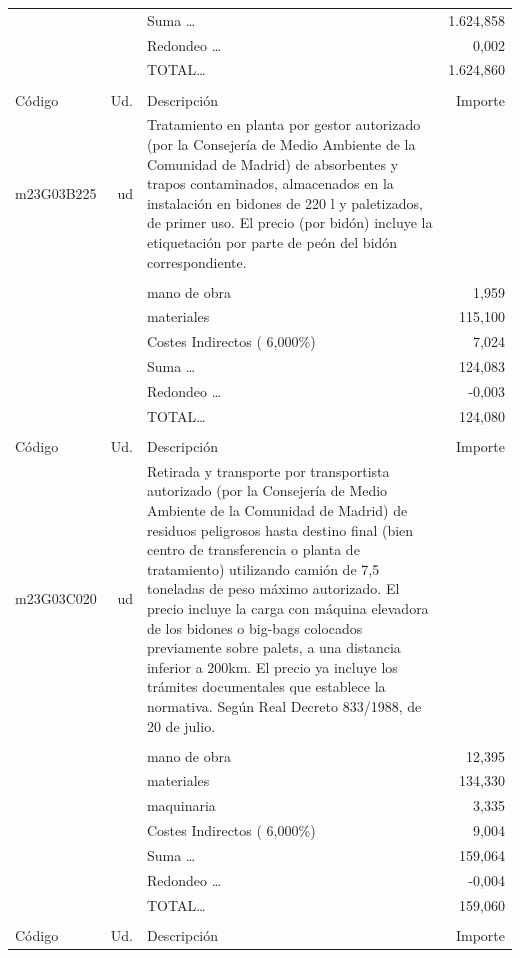 \begin{supertabular}{l r p{60mm} r}
&&Suma \ldots& 1.624,858\\%
&&Redondeo \ldots&     0,002\\%
%
&&TOTAL\ldots& 1.624,860\\%
&&&\\%
Código&Ud.&Descripción&Importe\\%
\hline%
m23G03B225&ud&Tratamiento en planta por gestor autorizado (por la Consejería de Medio Ambiente de la Comunidad de Madrid) de absorbentes y trapos contaminados, almacenados en la instalación en bidones de 220 l y paletizados, de primer uso. El precio (por bidón) incluye la etiquetación por parte de peón del bidón correspondiente.&\\%
&&&\\%
&&mano de obra&     1,959\\%
&&materiales&   115,100\\%
&&Costes Indirectos (     6,000\%)&     7,024\\%
&&Suma \ldots&   124,083\\%
&&Redondeo \ldots&    {-}0,003\\%
%
&&TOTAL\ldots&   124,080\\%
&&&\\%
Código&Ud.&Descripción&Importe\\%
\hline%
m23G03C020&ud&Retirada y transporte por transportista autorizado (por la Consejería de Medio Ambiente de la Comunidad de Madrid) de residuos peligrosos hasta destino final (bien centro de transferencia o planta de tratamiento) utilizando camión de 7,5 toneladas de peso máximo autorizado. El precio incluye la carga con máquina elevadora de los bidones o big{-}bags colocados previamente sobre palets, a una distancia inferior a 200km. El precio ya incluye los trámites documentales que establece la normativa. Según Real Decreto 833/1988, de 20 de julio.&\\%
&&&\\%
&&mano de obra&    12,395\\%
&&materiales&   134,330\\%
&&maquinaria&     3,335\\%
&&Costes Indirectos (     6,000\%)&     9,004\\%
&&Suma \ldots&   159,064\\%
&&Redondeo \ldots&    {-}0,004\\%
%
&&TOTAL\ldots&   159,060\\%
&&&\\%
Código&Ud.&Descripción&Importe\\%

\end{supertabular}
